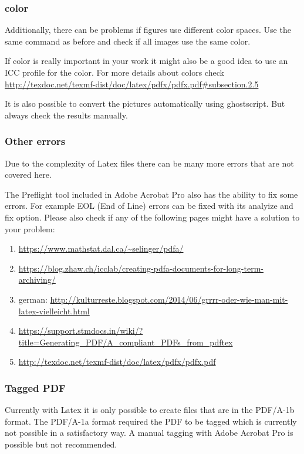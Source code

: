 	\subsubsection{color}
	Additionally, there can be problems if figures use different color spaces. Use the same command as before and check if all images use the same color. 
	
	If color is really important in your work it might also be a good idea to use an ICC profile for the color. 
	For more details about colors check \url{http://texdoc.net/texmf-dist/doc/latex/pdfx/pdfx.pdf#subsection.2.5}
	
	It is also possible to convert the pictures automatically using ghostscript. But always check the results manually. 
	
	\subsubsection{Other errors}
	Due to the complexity of Latex files there can be many more errors that are not covered here.
	
	The Preflight tool included in Adobe Acrobat Pro also has the ability to fix some errors. For example EOL (End of Line) errors can be fixed with its analyize and fix option. 
	Please also check if any of the following pages might have a solution to your problem:
	\begin{enumerate}
		\item \url{https://www.mathstat.dal.ca/~selinger/pdfa/}
		\item \url{https://blog.zhaw.ch/icclab/creating-pdfa-documents-for-long-term-archiving/}
		\item german: \url{http://kulturreste.blogspot.com/2014/06/grrrr-oder-wie-man-mit-latex-vielleicht.html}
		\item \url{https://support.stmdocs.in/wiki/?title=Generating_PDF/A_compliant_PDFs_from_pdftex}
		\item \url{http://texdoc.net/texmf-dist/doc/latex/pdfx/pdfx.pdf}
	\end{enumerate}
	
	\subsubsection{Tagged PDF}
	Currently with Latex it is only possible to create files that are in the PDF/A-1b format. The PDF/A-1a format required the PDF to be tagged which is currently not possible in a satisfactory way.
	A manual tagging with Adobe Acrobat Pro is possible but not recommended.
	
